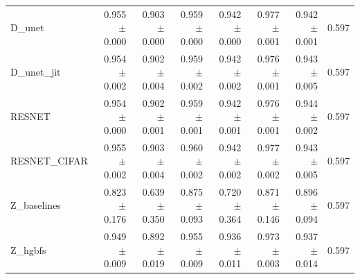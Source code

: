 \begin{table}[ht]
\begin{tabular}{lrrrrrrr}
D\_unet & 0.955 $\pm$ 0.000 & 0.903 $\pm$ 0.000 & 0.959 $\pm$ 0.000 & 0.942 $\pm$ 0.000 & 0.977 $\pm$ 0.001 & 0.942 $\pm$ 0.001 & 0.597 \\
D\_unet\_jit & 0.954 $\pm$ 0.002 & 0.902 $\pm$ 0.004 & 0.959 $\pm$ 0.002 & 0.942 $\pm$ 0.002 & 0.976 $\pm$ 0.001 & 0.943 $\pm$ 0.005 & 0.597 \\
RESNET & 0.954 $\pm$ 0.000 & 0.902 $\pm$ 0.001 & 0.959 $\pm$ 0.001 & 0.942 $\pm$ 0.001 & 0.976 $\pm$ 0.001 & 0.944 $\pm$ 0.002 & 0.597 \\
RESNET\_CIFAR & 0.955 $\pm$ 0.002 & 0.903 $\pm$ 0.004 & 0.960 $\pm$ 0.002 & 0.942 $\pm$ 0.002 & 0.977 $\pm$ 0.002 & 0.943 $\pm$ 0.005 & 0.597 \\
Z\_baselines & 0.823 $\pm$ 0.176 & 0.639 $\pm$ 0.350 & 0.875 $\pm$ 0.093 & 0.720 $\pm$ 0.364 & 0.871 $\pm$ 0.146 & 0.896 $\pm$ 0.094 & 0.597 \\
Z\_hgbfs & 0.949 $\pm$ 0.009 & 0.892 $\pm$ 0.019 & 0.955 $\pm$ 0.009 & 0.936 $\pm$ 0.011 & 0.973 $\pm$ 0.003 & 0.937 $\pm$ 0.014 & 0.597 \\
\hline
\end{tabular}
\end{table}

